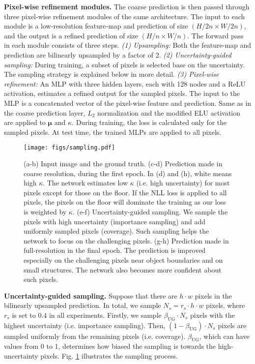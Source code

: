 \documentclass[10pt,twocolumn,letterpaper]{article}
\begin{document}
\noindent
\textbf{Pixel-wise refinement modules.} The coarse prediction is then passed through three pixel-wise refinement modules of the same architecture. The input to each module is a low-resolution feature-map and prediction of size $(H/2n \times  W/2n)$, and the output is a refined prediction of size $(H/n \times  W/n)$. The forward pass in each module consists of three steps. \textit{(1) Upsampling:} Both the feature-map and prediction are bilinearly upsampled by a factor of 2. \textit{(2) Uncertainty-guided sampling:} During training, a subset of pixels is selected base on the uncertainty. The sampling strategy is explained below in more detail. \textit{(3) Pixel-wise refinement:} An MLP with three hidden layers, each with 128 nodes and a ReLU \cite{other-RELU} activation, estimates a refined output for the sampled pixels. The input to the MLP is a concatenated vector of the pixel-wise feature and prediction. Same as in the coarse prediction layer, $L_2$ normalization and the modified ELU activation are applied to $\boldsymbol{\mu}$ and $\kappa$. During training, the loss is calculated only for the sampled pixels. At test time, the trained MLPs are applied to all pixels.

\begin{figure}[t]
\begin{center}
\texttt{[image: figs/sampling.pdf]}
\end{center}
\caption{(a-b) Input image and the ground truth. (c-d) Prediction made in coarse resolution, during the first epoch. In (d) and (h), white means high $\kappa$. The network estimates low $\kappa$ (i.e. high uncertainty) for most pixels except for those on the floor. If the NLL loss is applied to all pixels, the pixels on the floor will dominate the training as our loss is weighted by $\kappa$. (e-f) Uncertainty-guided sampling. We sample the pixels with high uncertainty (importance sampling) and add uniformly sampled pixels (coverage). Such sampling helps the network to focus on the challenging pixels. (g-h) Prediction made in full-resolution in the final epoch. The prediction is improved especially on the challenging pixels near object boundaries and on small structures. The network also becomes more confident about such pixels.}
\label{fig:sampling}
\end{figure}

\noindent
\textbf{Uncertainty-guided sampling.} Suppose that there are $h \cdot w$ pixels in the bilinearly upsampled prediction. In total, we sample $N_s = r_s \cdot h \cdot w$ pixels, where $r_s$ is set to $0.4$ in all experiments. Firstly, we sample $\beta_\text{UG} \cdot N_s$ pixels with the highest uncertainty (i.e. importance sampling). Then, $(1-\beta_\text{UG}) \cdot N_s$ pixels are sampled uniformly from the remaining pixels (i.e. coverage). $\beta_\text{UG}$, which can have values from 0 to 1, determines how biased the sampling is towards the high-uncertainty pixels. Fig. \ref{fig:sampling} illustrates the sampling process. 
\end{document}
